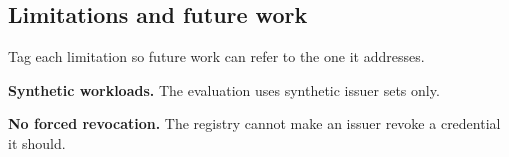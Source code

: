 \subsection[Limitations and future work]{Limitations and future work\skimmark}\label{app:chapters:future}
Tag each limitation so future work can refer to the one it addresses.
\begin{limitations}
  \item\label{lim:guide:synthetic} \textbf{Synthetic workloads.} The evaluation uses synthetic issuer sets only.
  \item\label{lim:guide:force} \textbf{No forced revocation.} The registry cannot make an issuer revoke a credential it should.
\end{limitations}
